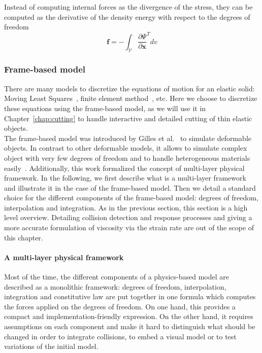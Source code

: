 Instead of computing internal forces as the divergence of the stress, they can be computed as the derivative of the density energy with respect to the degrees of freedom
\begin{equation}
\label{eq:internalForces_solids}
\mathbf{f} = -\int_{\mathcal{V}} \frac{\partial \Psi}{\partial \mathbf{x}}^{T} dv
\end{equation}

\subsubsection{Frame-based model}
\label{subsubsec:framebased}
There are many models to discretize the equations of motion for an elastic solid: Moving Least Squares~\cite{Muller2004:melting}, finite element method~\cite{OBrien1999}, etc.
Here we choose to discretize these equations using the frame-based model, as we will use it in Chapter~\ref{chap:cutting} to handle interactive and detailed cutting of thin elastic objects.
\\
The frame-based model was introduced by Gilles et al.~\cite{Gilles2011} to simulate deformable objects. 
In contrast to other deformable models, it allows to simulate complex object with very few degrees of freedom and to handle heterogeneous materials easily~\cite{Faure2011}. 
Additionally, this work formalized the concept of multi-layer physical framework. 
In the following, we first describe what is a multi-layer framework and illustrate it in the case of the frame-based model. 
Then we detail a standard choice for the different components of the frame-based model: degrees of freedom, interpolation and integration. 
As in the previous section, this section is a high level overview. 
Detailing collision detection and response processes and giving a more accurate formulation of viscosity via the strain rate are out of the scope of this chapter.

\paragraph{A multi-layer physical framework}
Most of the time, the different components of a physics-based model are described as a monolithic framework: degrees of freedom, interpolation, integration and constitutive law are put together in one formula which computes the forces applied on the degrees of freedom. On one hand, this provides a compact and implementation-friendly expression. 
On the other hand, it requires assumptions on each component and make it hard to distinguish what should be changed in order to integrate collisions, to embed a visual model or to test variations of the initial model.

